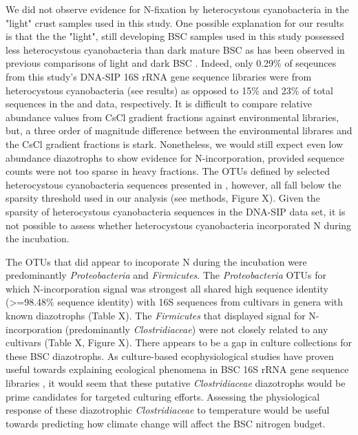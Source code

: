 We did not observe evidence for N-fixation by heterocystous cyanobacteria in the "light" crust samples used in this study. One possible explanation for our results is that the the "light", still developing BSC samples used in this study possessed less heterocystous cyanobacteria than dark mature BSC as has been observed in previous comparisons of light and dark BSC \cite{14766579}. Indeed, only 0.29\% of seqeunces from this study's DNA-SIP 16S rRNA gene sequence libraries were from heterocystous cyanobacteria (see results) as opposed to 15\% and 23\% of total sequences in the \citet{Steven_2013} and \citet{Garcia_Pichel_2013} data, respectively. It is difficult to compare relative abundance values from CsCl gradient fractions against environmental libraries, but, a three order of magnitude difference between the environmental librares and the CsCl gradient fractions is stark. Nonetheless, we would still expect even low abundance diazotrophs to show evidence for N-incorporation, provided sequence counts were not too sparse in heavy fractions. The OTUs defined by selected heterocystous cyanobacteria sequences presented in \citet{Yeager}, however, all fall below the sparsity threshold used in our analysis (see methods, Figure X). Given the sparsity of heterocystous cyanobacteria sequences in the DNA-SIP data set, it is not possible to assess whether heterocystous cyanobacteria incorporated N during the incubation.

The OTUs that did appear to incoporate N during the incubation were predominantly \textit{Proteobacteria} and \textit{Firmicutes}. The \textit{Proteobacteria} OTUs for which N-incorporation signal was strongest all shared high sequence identity (\textgreater=98.48\% sequence identity) with 16S sequences from cultivars in genera with known diazotrophs (Table X). The \textit{Firmicutes} that displayed signal for N-incorporation (predominantly \textit{Clostridiaceae}) were not closely related to any cultivars (Table X, Figure X). There appears to be a gap in culture collections for these BSC diazotrophs. As culture-based ecophysiological studies have proven useful towards explaining ecological phenomena in BSC 16S rRNA gene sequence libraries \cite{Garcia_Pichel_2013}, it would seem that these putative \textit{Clostridiaceae} diazotrophs would be prime candidates for targeted culturing efforts. Assessing the physiological response of these diazotrophic \textit{Clostridiaceae} to temperature would be useful towards predicting how climate change will affect the BSC nitrogen budget. 

